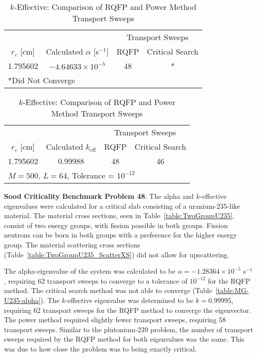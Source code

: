 \begin{table}[!htbp]
	\caption{Calculated Eigenvalues and Transport Sweep Comparisons for Two-Group Pu-239 Cross Sections in \cite{sood2003analytical}}
	\label{table:SlabMG-Pu239}
	\begin{subtable}[h]{1.0\textwidth}
	\centering{}
	\begin{tabular}{@{}cccc@{}}\toprule
	& & \multicolumn{2}{c}{Transport Sweeps} \\
	\cmidrule{3-4} $r_{c}$ [cm] & Calculated $\alpha$ [s$^{-1}$] & RQFP & Critical Search\\
	\midrule
	1.795602 & $-4.64633 \times 10^{-5}$ & 48 & * \\
	\bottomrule
	\multicolumn{4}{l}{*Did Not Converge} \\
	\end{tabular}
	\caption{Alpha-Eigenvalue: Comparison of RQFP and Critical Search Transport Sweeps}
	\label{table:MG-Pu239-alpha}
	\end{subtable}%
	\vspace{0.25cm}
	\begin{subtable}[h]{1.0\textwidth}
	\centering{}
	\begin{tabular}{@{}cccc@{}}\toprule
	& & \multicolumn{2}{c}{Transport Sweeps} \\
	\cmidrule{3-4} $r_{c}$ [cm] & Calculated $k_{\text{eff}}$ & RQFP & Critical Search\\
	\midrule
	1.795602 & 0.99988 & 48 & 46 \\
	\bottomrule%
	\multicolumn{4}{l}{$M = 500$, $L = 64$, Tolerance = $10^{-12}$} \\
	\end{tabular}
	\caption{$k$-Effective: Comparison of RQFP and Power Method Transport Sweeps}
	\label{table:MG-Pu239-k}
	\end{subtable}
\end{table}

\clearpage

\textbf{Sood Criticality Benchmark Problem 48}: The alpha and $k$-effective eigenvalues were calculated for a critical slab consisting of a uranium-235-like material. The material cross sections, seen in Table~\ref{table:TwoGroupU235}, consist of two energy groups, with fission possible in both groups. Fission neutrons can be born in both groups with a preference for the higher energy group. The material scattering cross sections (Table~\ref{table:TwoGroupU235_ScatterXS}) did not allow for upscattering.

The alpha-eigenvalue of the system was calculated to be $\alpha = -1.28364 \times 10^{-5}$ s$^{-1}$, requiring 62 transport sweeps to converge to a tolerance of $10^{-12}$ for the RQFP method. The critical search method was not able to converge (Table~\ref{table:MG-U235-alpha}). The $k$-effective eigenvalue was determined to be $k=0.99995$, requiring 62 transport sweeps for the RQFP method to converge the eigenvector. The power method required slightly fewer transport sweeps, requiring 58 transport sweeps. Similar to the plutonium-239 problem, the number of transport sweeps required by the RQFP method for both eigenvalues was the same. This was due to how close the problem was to being exactly critical.

